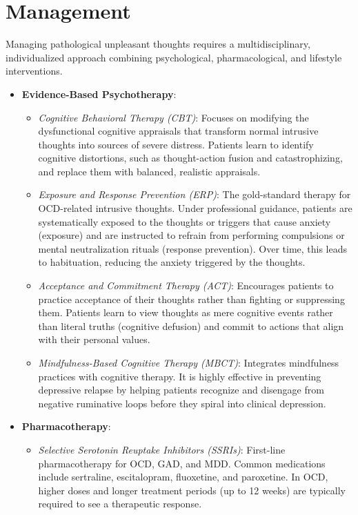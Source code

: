 \section*{Management}
Managing pathological unpleasant thoughts requires a multidisciplinary, individualized approach combining psychological, pharmacological, and lifestyle interventions.
\begin{itemize}
  \item \textbf{Evidence-Based Psychotherapy}:
    \begin{itemize}
      \item \textit{Cognitive Behavioral Therapy (CBT)}: Focuses on modifying the dysfunctional cognitive appraisals that transform normal intrusive thoughts into sources of severe distress. Patients learn to identify cognitive distortions, such as thought-action fusion and catastrophizing, and replace them with balanced, realistic appraisals.
      \item \textit{Exposure and Response Prevention (ERP)}: The gold-standard therapy for OCD-related intrusive thoughts. Under professional guidance, patients are systematically exposed to the thoughts or triggers that cause anxiety (exposure) and are instructed to refrain from performing compulsions or mental neutralization rituals (response prevention). Over time, this leads to habituation, reducing the anxiety triggered by the thoughts.
      \item \textit{Acceptance and Commitment Therapy (ACT)}: Encourages patients to practice acceptance of their thoughts rather than fighting or suppressing them. Patients learn to view thoughts as mere cognitive events rather than literal truths (cognitive defusion) and commit to actions that align with their personal values.
      \item \textit{Mindfulness-Based Cognitive Therapy (MBCT)}: Integrates mindfulness practices with cognitive therapy. It is highly effective in preventing depressive relapse by helping patients recognize and disengage from negative ruminative loops before they spiral into clinical depression.
    \end{itemize}
  \item \textbf{Pharmacotherapy}:
    \begin{itemize}
      \item \textit{Selective Serotonin Reuptake Inhibitors (SSRIs)}: First-line pharmacotherapy for OCD, GAD, and MDD. Common medications include sertraline, escitalopram, fluoxetine, and paroxetine. In OCD, higher doses and longer treatment periods (up to 12 weeks) are typically required to see a therapeutic response.

\end{itemize}
\end{itemize}
